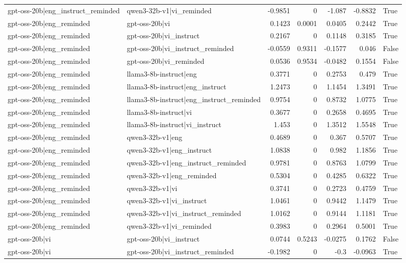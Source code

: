 \begin{table}
\begin{tabular}{l l r r r r l}
gpt-oss-20b|eng_instruct_reminded & qwen3-32b-v1|vi_reminded & -0.9851 & 0 & -1.087 & -0.8832 & True \\
gpt-oss-20b|eng_reminded & gpt-oss-20b|vi & 0.1423 & 0.0001 & 0.0405 & 0.2442 & True \\
gpt-oss-20b|eng_reminded & gpt-oss-20b|vi_instruct & 0.2167 & 0 & 0.1148 & 0.3185 & True \\
gpt-oss-20b|eng_reminded & gpt-oss-20b|vi_instruct_reminded & -0.0559 & 0.9311 & -0.1577 & 0.046 & False \\
gpt-oss-20b|eng_reminded & gpt-oss-20b|vi_reminded & 0.0536 & 0.9534 & -0.0482 & 0.1554 & False \\
gpt-oss-20b|eng_reminded & llama3-8b-instruct|eng & 0.3771 & 0 & 0.2753 & 0.479 & True \\
gpt-oss-20b|eng_reminded & llama3-8b-instruct|eng_instruct & 1.2473 & 0 & 1.1454 & 1.3491 & True \\
gpt-oss-20b|eng_reminded & llama3-8b-instruct|eng_instruct_reminded & 0.9754 & 0 & 0.8732 & 1.0775 & True \\
gpt-oss-20b|eng_reminded & llama3-8b-instruct|vi & 0.3677 & 0 & 0.2658 & 0.4695 & True \\
gpt-oss-20b|eng_reminded & llama3-8b-instruct|vi_instruct & 1.453 & 0 & 1.3512 & 1.5548 & True \\
gpt-oss-20b|eng_reminded & qwen3-32b-v1|eng & 0.4689 & 0 & 0.367 & 0.5707 & True \\
gpt-oss-20b|eng_reminded & qwen3-32b-v1|eng_instruct & 1.0838 & 0 & 0.982 & 1.1856 & True \\
gpt-oss-20b|eng_reminded & qwen3-32b-v1|eng_instruct_reminded & 0.9781 & 0 & 0.8763 & 1.0799 & True \\
gpt-oss-20b|eng_reminded & qwen3-32b-v1|eng_reminded & 0.5304 & 0 & 0.4285 & 0.6322 & True \\
gpt-oss-20b|eng_reminded & qwen3-32b-v1|vi & 0.3741 & 0 & 0.2723 & 0.4759 & True \\
gpt-oss-20b|eng_reminded & qwen3-32b-v1|vi_instruct & 1.0461 & 0 & 0.9442 & 1.1479 & True \\
gpt-oss-20b|eng_reminded & qwen3-32b-v1|vi_instruct_reminded & 1.0162 & 0 & 0.9144 & 1.1181 & True \\
gpt-oss-20b|eng_reminded & qwen3-32b-v1|vi_reminded & 0.3983 & 0 & 0.2964 & 0.5001 & True \\
gpt-oss-20b|vi & gpt-oss-20b|vi_instruct & 0.0744 & 0.5243 & -0.0275 & 0.1762 & False \\
gpt-oss-20b|vi & gpt-oss-20b|vi_instruct_reminded & -0.1982 & 0 & -0.3 & -0.0963 & True \\

\end{tabular}
\end{table}
